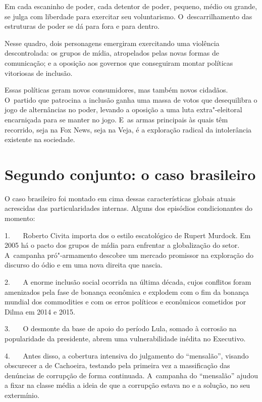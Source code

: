 Em cada escaninho de poder, cada detentor de poder, pequeno, médio ou
grande, se julga com liberdade para exercitar seu voluntarismo. O~descarrilhamento das estruturas de poder se dá para fora e para dentro.

Nesse quadro, dois personagens emergiram exercitando uma violência
descontrolada: os grupos de mídia, atropelados pelas novas formas de
comunicação; e a oposição aos governos que conseguiram montar políticas
vitoriosas de inclusão.

Essas políticas geram novos consumidores, mas também novos cidadãos. O~partido que patrocina a inclusão ganha uma massa de votos que
desequilibra o jogo de alternâncias no poder, levando a oposição a uma
luta extra"-eleitoral encarniçada para se manter no jogo. E~as armas
principais às quais têm recorrido, seja na Fox News, seja na Veja, é a
exploração radical da intolerância existente na sociedade.

\section{Segundo conjunto: o caso brasileiro}

O caso brasileiro foi montado em cima dessas características globais
atuais acrescidas das particularidades internas. Alguns dos episódios
condicionantes do momento:

1.~~~ Roberto Civita importa dos  o estilo escatológico de Rupert
Murdock. Em 2005 há o pacto dos grupos de mídia para enfrentar a
globalização do setor. A~campanha pró"-armamento descobre um mercado
promissor na exploração do discurso do ódio e em uma nova direita que
nascia.

2.~~~ A enorme inclusão social ocorrida na última década, cujos
conflitos foram amenizados pela fase de bonança econômica e explodem com
o fim da bonança mundial dos commodities e com os erros políticos e
econômicos cometidos por Dilma em 2014 e 2015.

3.~~~ O desmonte da base de apoio do período Lula, somado à corrosão na
popularidade da presidente, abrem uma vulnerabilidade inédita no
Executivo.

4.~~~ Antes disso, a cobertura intensiva do julgamento do ``mensalão'',
visando obscurecer a  de Cachoeira, testando pela primeira vez a
massificação das denúncias de corrupção de forma continuada. A~campanha
do ``mensalão'' ajudou a fixar na classe média a ideia de que a
corrupção estava no  e a solução, no seu extermínio.


